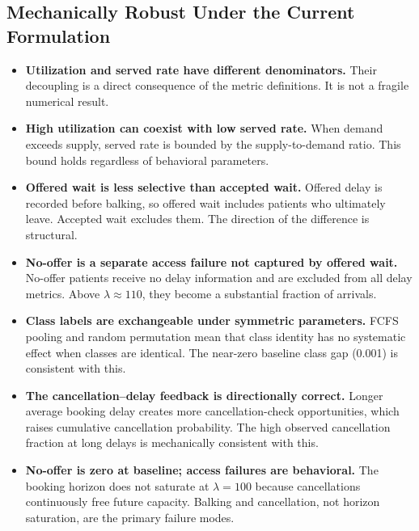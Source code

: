 \documentclass[11pt]{article}
\begin{document}
\subsection{Mechanically Robust Under the Current Formulation}

\begin{itemize}[leftmargin=1.5em, itemsep=3pt]
\item \textbf{Utilization and served rate have different denominators.}
Their decoupling is a direct consequence of the metric definitions. It
is not a fragile numerical result.

\item \textbf{High utilization can coexist with low served rate.}
When demand exceeds supply, served rate is bounded by the supply-to-demand
ratio. This bound holds regardless of behavioral parameters.

\item \textbf{Offered wait is less selective than accepted wait.}
Offered delay is recorded before balking, so offered wait includes patients
who ultimately leave. Accepted wait excludes them. The direction of the
difference is structural.

\item \textbf{No-offer is a separate access failure not captured by
offered wait.} No-offer patients receive no delay information and are
excluded from all delay metrics. Above $\lambda \approx 110$, they become
a substantial fraction of arrivals.

\item \textbf{Class labels are exchangeable under symmetric parameters.}
FCFS pooling and random permutation mean that class identity has no
systematic effect when classes are identical. The near-zero baseline class
gap (0.001) is consistent with this.

\item \textbf{The cancellation--delay feedback is directionally correct.}
Longer average booking delay creates more cancellation-check opportunities,
which raises cumulative cancellation probability. The high observed
cancellation fraction at long delays is mechanically consistent with this.

\item \textbf{No-offer is zero at baseline; access failures are behavioral.}
The booking horizon does not saturate at $\lambda = 100$ because
cancellations continuously free future capacity. Balking and cancellation,
not horizon saturation, are the primary failure modes.
\end{itemize}
\end{document}
